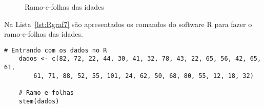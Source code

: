\documentclass[11pt,fleqn]{book} %
\begin{document}
\begin{example}
	
\begin{figure}[h!]
	\begin{center}
	\end{center}
	\setlength{\abovecaptionskip}{0.5pt}
\caption{Ramo-e-folhas das idades}
\label{fig:grafrf1} %
\end{figure}

\end{example}

\vspace{0.5cm}

Na Lista~\ref{lst:Rgraf7} são apresentados os comandos do software R para fazer o ramo-e-folhas das idades.  \\


\begin{scriptsize}
	\estiloR
	\begin{lstlisting}[caption={Comandos do software R}, label=lst:Rgraf7]
	# Entrando com os dados no R
	dados <- c(82, 72, 22, 44, 30, 41, 32, 78, 43, 22, 65, 56, 42, 65, 61, 
		61, 71, 88, 52, 55, 101, 24, 62, 50, 68, 80, 55, 12, 18, 32)

	# Ramo-e-folhas
	stem(dados)

	\end{lstlisting}
\end{scriptsize}
\end{document}
